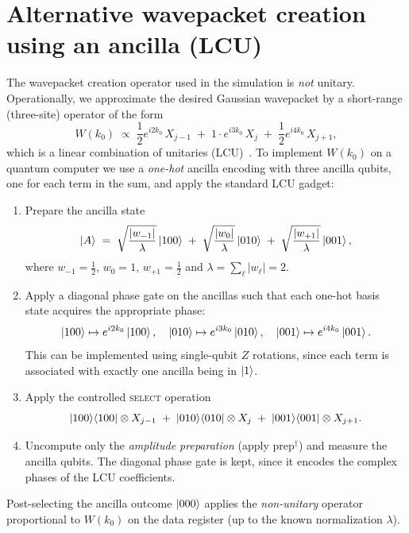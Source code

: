 \documentclass[11pt]{article}
\begin{document}
\section{Alternative wavepacket creation using an ancilla (LCU)}
The wavepacket creation operator used in the simulation is \emph{not} unitary. Operationally, we approximate the desired Gaussian wavepacket by a short-range
(three-site) operator of the form
\begin{equation}
W(k_0)\;\propto\;
\frac{1}{2}e^{i 2k_0}\,X_{j-1} \;+\;
1\cdot e^{i 3k_0}\,X_{j} \;+\;
\frac{1}{2}e^{i 4k_0}\,X_{j+1},
\end{equation}
which is a linear combination of unitaries (LCU)~\cite{2012_LCU,Berry_2015}. To implement $W(k_0)$ on a quantum
computer we use a \emph{one-hot} ancilla encoding with three ancilla qubits, one for
each term in the sum, and apply the standard LCU gadget:
\begin{enumerate}
  \item Prepare the ancilla state
        \begin{equation}
        \ket{A}
        \;=\;
        \sqrt{\frac{|w_{-1}|}{\lambda}}\ket{100}
        \;+\;
        \sqrt{\frac{|w_{0}|}{\lambda}}\ket{010}
        \;+\;
        \sqrt{\frac{|w_{+1}|}{\lambda}}\ket{001},
        \end{equation}
        where $w_{-1}=\tfrac{1}{2}$, $w_{0}=1$, $w_{+1}=\tfrac{1}{2}$ and
        $\lambda=\sum_\ell |w_\ell|=2$.
  \item Apply a diagonal phase gate on the ancillas such that each one-hot basis
        state acquires the appropriate phase:
        \begin{equation}
        \ket{100}\mapsto e^{i2k_0}\ket{100},\quad
        \ket{010}\mapsto e^{i3k_0}\ket{010},\quad
        \ket{001}\mapsto e^{i4k_0}\ket{001}.
        \end{equation}
        This can be implemented using single-qubit $Z$ rotations, since each term
        is associated with exactly one ancilla being in $\ket{1}$.
  \item Apply the controlled \textsc{select} operation
        \begin{equation}
        \ket{100}\!\bra{100}\otimes X_{j-1}
        \;+\;
        \ket{010}\!\bra{010}\otimes X_{j}
        \;+\;
        \ket{001}\!\bra{001}\otimes X_{j+1}.
        \end{equation}
  \item Uncompute only the \emph{amplitude preparation} (apply prep$^\dagger$) and
        measure the ancilla qubits. The diagonal phase gate is kept, since it
        encodes the complex phases of the LCU coefficients.
\end{enumerate}
Post-selecting the ancilla outcome $\ket{000}$ applies the \emph{non-unitary}
operator proportional to $W(k_0)$ on the data register (up to the known
normalization $\lambda$).
\end{document}
